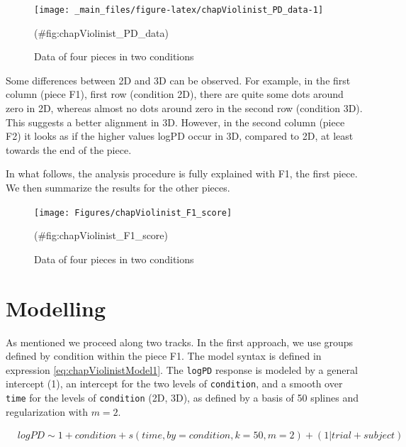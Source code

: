 \documentclass[
]{book}
\theoremstyle{definition}
\theoremstyle{definition}
\theoremstyle{definition}
\theoremstyle{definition}
\theoremstyle{remark}
\begin{document}
\begin{figure}

{\centering \texttt{[image: \_main\_files/figure-latex/chapViolinist\_PD\_data-1]} 

}

\caption{Data of four pieces in two conditions}(\#fig:chapViolinist_PD_data)
\end{figure}

Some differences between 2D and 3D can be observed. For example, in the first column (piece F1), first row (condition 2D), there are quite some dots around zero in 2D, whereas almost no dots around zero in the second row (condition 3D). This suggests a better alignment in 3D. However, in the second column (piece F2) it looks as if the higher values logPD occur in 3D, compared to 2D, at least towards the end of the piece.

In what follows, the analysis procedure is fully explained with F1, the first piece. We then summarize the results for the other pieces.

\begin{figure}

{\centering \texttt{[image: Figures/chapViolinist\_F1\_score]} 

}

\caption{Data of four pieces in two conditions}(\#fig:chapViolinist_F1_score)
\end{figure}

\hypertarget{modelling}{%
\section{Modelling}\label{modelling}}

As mentioned we proceed along two tracks.
In the first approach, we use groups defined by condition within the piece F1.
The model syntax is defined in expression \eqref{eq:chapViolinistModel1}.
The \texttt{logPD} response is modeled by a general intercept (1), an intercept for the two levels of \texttt{condition}, and a smooth over \texttt{time} for the levels of \texttt{condition} (2D, 3D), as defined by a basis of 50 splines and regularization with \(m=2\).

\begin{equation}
\begin{matrix}
&logPD \sim 1 + condition +  s(time, by = condition, k = 50,m=2) + 
(1 | trial + subject)
\end{matrix}
\label{eq:chapViolinistModel1}
\end{equation}
\end{document}
